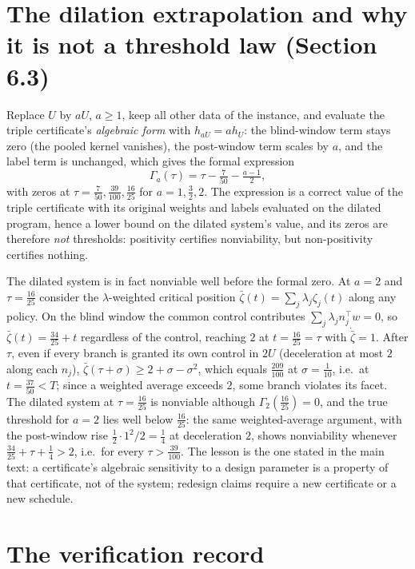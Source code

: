 \documentclass[11pt,a4paper]{article}
\theoremstyle{plain}
\theoremstyle{definition}
\theoremstyle{remark}
\newcommand{\tfr}[2]{\tfrac{#1}{#2}}
\begin{document}
\section{The dilation extrapolation and why it is not a threshold law (Section 6.3)}\label{S:dilation}

Replace $U$ by $aU$, $a\ge1$, keep all other data of the instance, and evaluate the triple certificate's \emph{algebraic form} with $h_{aU}=ah_U$: the blind-window term stays zero (the pooled kernel vanishes), the post-window term scales by $a$, and the label term is unchanged, which gives the formal expression
\[
\Gamma_a(\tau)=\tau-\tfr7{50}-\tfrac{a-1}2 ,
\]
with zeros at $\tau=\tfr7{50},\tfr{39}{100},\tfr{16}{25}$ for $a=1,\tfr32,2$. The expression is a correct value of the triple certificate with its original weights and labels evaluated on the dilated program, hence a lower bound on the dilated system's value, and its zeros are therefore \emph{not} thresholds: positivity certifies nonviability, but non-positivity certifies nothing.

The dilated system is in fact nonviable well before the formal zero. At $a=2$ and $\tau=\tfr{16}{25}$ consider the $\lambda$-weighted critical position $\bar\zeta(t)=\sum_j\lambda_j\zeta_j(t)$ along any policy. On the blind window the common control contributes $\sum_j\lambda_jn_j^\top w=0$, so $\bar\zeta(t)=\tfr{34}{25}+t$ regardless of the control, reaching $2$ at $t=\tfr{16}{25}=\tau$ with $\dot{\bar\zeta}=1$. After $\tau$, even if every branch is granted its own control in $2U$ (deceleration at most $2$ along each $n_j$), $\bar\zeta(\tau+\sigma)\ge2+\sigma-\sigma^2$, which equals $\tfr{209}{100}$ at $\sigma=\tfr1{10}$, i.e.\ at $t=\tfr{37}{50}<T$; since a weighted average exceeds $2$, some branch violates its facet. The dilated system at $\tau=\tfr{16}{25}$ is nonviable although $\Gamma_2(\tfr{16}{25})=0$, and the true threshold for $a=2$ lies well below $\tfr{16}{25}$: the same weighted-average argument, with the post-window rise $\tfrac12\cdot1^2/2=\tfr14$ at deceleration $2$, shows nonviability whenever $\tfr{34}{25}+\tau+\tfr14>2$, i.e.\ for every $\tau>\tfr{39}{100}$. The lesson is the one stated in the main text: a certificate's algebraic sensitivity to a design parameter is a property of that certificate, not of the system; redesign claims require a new certificate or a new schedule.
\section{The verification record}\label{S:verification}
\end{document}
